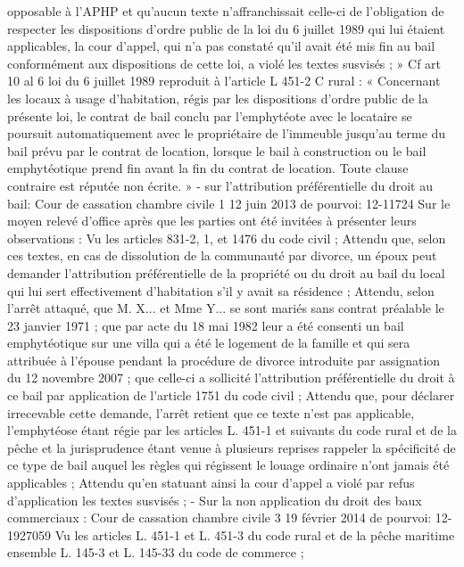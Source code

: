 \documentclass[11pt,a4paper]{report}
\begin{document}
	opposable à l'APHP et qu'aucun texte n'affranchissait celle-ci de l'obligation de respecter les dispositions
	d'ordre public de la loi du 6 juillet 1989 qui lui étaient applicables, la cour d'appel, qui n'a pas constaté qu'il
	avait été mis fin au bail conformément aux dispositions de cette loi, a violé les textes susvisés ; »
	Cf art 10 al 6 loi du 6 juillet 1989 reproduit à l’article L 451-2 C rural : « Concernant les locaux à usage
	d'habitation, régis par les dispositions d'ordre public de la présente loi, le contrat de bail conclu par
	l'emphytéote avec le locataire se poursuit automatiquement avec le propriétaire de l'immeuble jusqu'au terme du
	bail prévu par le contrat de location, lorsque le bail à construction ou le bail emphytéotique prend fin avant la
	fin du contrat de location. Toute clause contraire est réputée non écrite. »
	- sur l’attribution préférentielle du droit au bail: Cour de cassation chambre civile 1 12 juin 2013 \No  de
	pourvoi: 12-11724
	Sur le moyen relevé d'office après que les parties ont été invitées à présenter leurs observations :
	Vu les articles 831-2, 1\degre , et 1476 du code civil ;
	Attendu que, selon ces textes, en cas de dissolution de la communauté par divorce, un époux peut demander
	l'attribution préférentielle de la propriété ou du droit au bail du local qui lui sert effectivement d'habitation s'il y
	avait sa résidence ;
	Attendu, selon l'arrêt attaqué, que M. X... et Mme Y... se sont mariés sans contrat préalable le 23 janvier 1971 ;
	que par acte du 18 mai 1982 leur a été consenti un bail emphytéotique sur une villa qui a été le logement de la
	famille et qui sera attribuée à l'épouse pendant la procédure de divorce introduite par assignation du 12
	novembre 2007 ; que celle-ci a sollicité l'attribution préférentielle du droit à ce bail par application de l'article
	1751 du code civil ;
	Attendu que, pour déclarer irrecevable cette demande, l'arrêt retient que ce texte n'est pas applicable,
	l'emphytéose étant régie par les articles L. 451-1 et suivants du code rural et de la pêche et la jurisprudence
	étant venue à plusieurs reprises rappeler la spécificité de ce type de bail auquel les règles qui régissent le louage
	ordinaire n'ont jamais été applicables ;
	Attendu qu'en statuant ainsi la cour d'appel a violé par refus d'application les textes susvisés ;
	- Sur la non application du droit des baux commerciaux : Cour de cassation chambre civile 3 19 février
	2014 \No  de pourvoi: 12-1927059
	Vu les articles L. 451-1 et L. 451-3 du code rural et de la pêche maritime ensemble L. 145-3 et L. 145-33 du
	code de commerce ;
\end{document}
